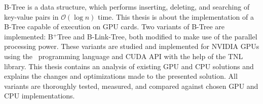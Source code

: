 B-Tree is a data structure, which performs inserting, deleting, and searching of key-value pairs in $\mathcal{O}(\log{n})$ time. This thesis is about the implementation of a B-Tree capable of execution on GPU cards. Two variants of B-Tree are implemented: B$^+$Tree and B-Link-Tree, both modified to make use of the parallel processing power. These variants are studied and implemented for NVIDIA GPUs using the \CC\ programming language and CUDA API with the help of the TNL library. This thesis contains an analysis of existing GPU and CPU solutions and explains the changes and optimizations made to the presented solution. All variants are thoroughly tested, measured, and compared against chosen GPU and CPU implementations.